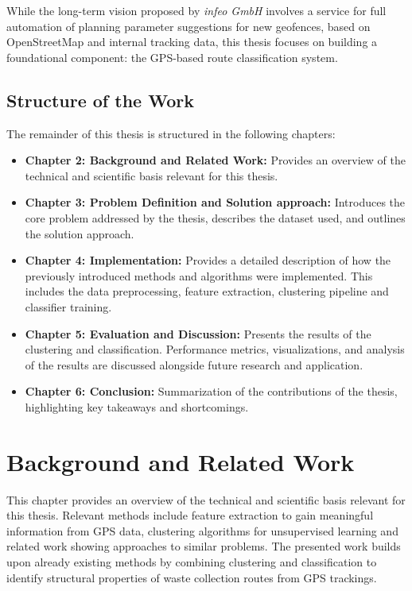 \documentclass[a4paper,12pt,twoside]{scrreprt}
\begin{document}
While the long-term vision proposed by \textit{infeo GmbH} involves a service
for full automation of planning parameter suggestions for new geofences, based
on OpenStreetMap and internal tracking data, this thesis focuses on building a
foundational component: the GPS-based route classification system.

\section{Structure of the Work}

The remainder of this thesis is structured in the following chapters:

\begin{itemize}
  \item \textbf{Chapter 2: Background and Related Work: } Provides an overview
        of the technical and scientific basis relevant for this thesis.
  \item \textbf{Chapter 3: Problem Definition and Solution approach:}
        Introduces the core problem addressed by the thesis, describes the
        dataset
        used, and outlines the solution approach.
  \item \textbf{Chapter 4: Implementation:} Provides a detailed description of
        how the previously introduced methods and algorithms were implemented.
        This
        includes the data preprocessing, feature extraction, clustering
        pipeline and
        classifier training.
  \item \textbf{Chapter 5: Evaluation and Discussion:} Presents the results of
        the clustering and classification. Performance metrics, visualizations,
        and
        analysis of the results are discussed alongside future research and
        application.
  \item \textbf{Chapter 6: Conclusion:} Summarization of the contributions of
        the thesis, highlighting key takeaways and shortcomings.
\end{itemize}

\chapter{Background and Related Work}
This chapter provides an overview of the technical and scientific basis
relevant for this thesis.
Relevant methods include feature extraction to gain meaningful information
from GPS data, clustering algorithms for unsupervised learning and related work
showing approaches to similar problems. The presented work builds upon already
existing methods by combining
clustering and classification to identify structural properties of waste
collection routes from GPS trackings.
\end{document}
